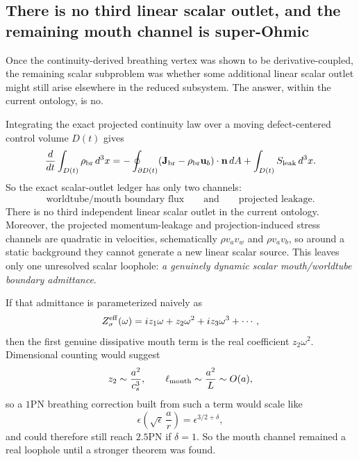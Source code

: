\documentclass[11pt]{article}
\begin{document}
\subsection{There is no third linear scalar outlet, and the remaining mouth channel is super-Ohmic}
\label{sec:scalar-audit-mouth}

Once the continuity-derived breathing vertex was shown to be derivative-coupled,
the remaining scalar subproblem was whether some additional linear scalar outlet
might still arise elsewhere in the reduced subsystem.  The answer, within the
current ontology, is no.

Integrating the exact projected continuity law over a moving defect-centered
control volume \(D(t)\) gives
\[
\frac{d}{dt}\int_{D(t)}\rho_{\rm br}\,d^3x
=
-\oint_{\partial D(t)}(\mathbf J_{\rm br}-\rho_{\rm br}\mathbf u_b)\cdot\mathbf n\,dA
+
\int_{D(t)}S_{\rm leak}\,d^3x.
\]
So the exact scalar-outlet ledger has only two channels:
\[
\boxed{\text{worldtube/mouth boundary flux}}
\qquad\text{and}\qquad
\boxed{\text{projected leakage}}.
\]
There is no third independent linear scalar outlet in the current ontology.
Moreover, the projected momentum-leakage and projection-induced stress channels
are quadratic in velocities, schematically \(\rho v_a v_w\) and
\(\rho v_a v_b\), so around a static background they cannot generate a new
linear scalar source.  This leaves only one unresolved scalar loophole:
\emph{a genuinely dynamic scalar mouth/worldtube boundary admittance}.

If that admittance is parameterized naively as
\[
Z_\sigma^{\rm eff}(\omega)=iz_1\omega+z_2\omega^2+iz_3\omega^3+\cdots,
\]
then the first genuine dissipative mouth term is the real coefficient
\(z_2\omega^2\).  Dimensional counting would suggest
\[
z_2\sim \frac{a^2}{c_s^3},
\qquad
\ell_{\rm mouth}\sim \frac{a^2}{L}\sim O(a),
\]
so a $1$PN breathing correction built from such a term would scale like
\[
\epsilon\left(\sqrt\epsilon\,\frac{a}{r}\right)
=
\epsilon^{3/2+\delta},
\]
and could therefore still reach $2.5$PN if \(\delta=1\).  So the mouth channel
remained a real loophole until a stronger theorem was found.
\end{document}
